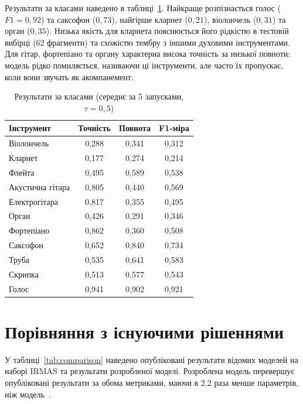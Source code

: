 Результати за класами наведено в таблиці~\ref{tab:perclass}. Найкраще
розпізнається голос ($F1 = 0{,}92$) та саксофон ($0{,}73$), найгірше
кларнет ($0{,}21$), віолончель ($0{,}31$) та орган ($0{,}35$). Низька якість
для кларнета пояснюється його рідкістю в тестовій вибірці (62 фрагменти)
та схожістю тембру з іншими духовими інструментами. Для гітар,
фортепіано та органу характерна висока точність за низької повноти:
модель рідко помиляється, називаючи ці інструменти, але часто їх
пропускає, коли вони звучать як акомпанемент.

\begin{table}[H]
\centering
\caption{Результати за класами (середнє за 5 запусками, $\tau = 0{,}5$)}
\label{tab:perclass}
\begin{tabular}{|l|c|c|c|}
\hline
Інструмент & Точність & Повнота & F1-міра \\
\hline
Віолончель       & 0,288 & 0,341 & 0,312 \\
Кларнет          & 0,177 & 0,274 & 0,214 \\
Флейта           & 0,495 & 0,589 & 0,538 \\
Акустична гітара & 0,805 & 0,440 & 0,569 \\
Електрогітара    & 0,817 & 0,355 & 0,495 \\
Орган            & 0,426 & 0,291 & 0,346 \\
Фортепіано       & 0,862 & 0,360 & 0,508 \\
Саксофон         & 0,652 & 0,840 & 0,734 \\
Труба            & 0,535 & 0,641 & 0,583 \\
Скрипка          & 0,513 & 0,577 & 0,543 \\
Голос            & 0,941 & 0,902 & 0,921 \\
\hline
\end{tabular}
\end{table}

\section{Порівняння з існуючими рішеннями}
\label{sec:comparison}

У таблиці~\ref{tab:comparison} наведено опубліковані результати відомих
моделей на наборі IRMAS та результати розробленої моделі.
Розроблена модель перевершує опубліковані результати за обома
метриками, маючи в 2,2 раза менше параметрів, ніж модель~\cite{han2017}.

